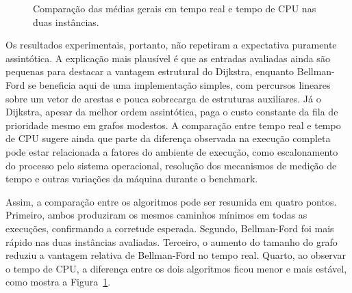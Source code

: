 \documentclass[12pt,a4paper]{article}
\begin{document}
\begin{figure}[h]
\centering
{}
\caption{Comparação das médias gerais em tempo real e tempo de CPU nas duas
instâncias.}
\label{fig:comparacao-tempo-real-cpu}
\end{figure}

Os resultados experimentais, portanto, não repetiram a expectativa puramente
assintótica. A explicação mais plausível é que as entradas avaliadas ainda são
pequenas para destacar a vantagem estrutural do Dijkstra, enquanto
Bellman-Ford se beneficia aqui de uma implementação simples, com percursos
lineares sobre um vetor de arestas e pouca sobrecarga de estruturas
auxiliares. Já o Dijkstra, apesar da melhor ordem assintótica, paga o custo
constante da fila de prioridade mesmo em grafos modestos. A comparação entre tempo real e tempo de CPU sugere ainda que parte da
diferença observada na execução completa pode estar relacionada a fatores do
ambiente de execução, como escalonamento do processo pelo sistema operacional,
resolução dos mecanismos de medição de tempo e outras variações da máquina
durante o benchmark.

Assim, a comparação entre os algoritmos pode ser resumida em quatro pontos.
Primeiro, ambos produziram os mesmos caminhos mínimos em todas as execuções,
confirmando a corretude esperada. Segundo, Bellman-Ford foi mais rápido nas
duas instâncias avaliadas. Terceiro, o aumento do tamanho do grafo reduziu a
vantagem relativa de Bellman-Ford no tempo real. Quarto, ao observar o tempo
de CPU, a diferença entre os dois algoritmos ficou menor e mais estável, como
mostra a Figura~\ref{fig:comparacao-tempo-real-cpu}.
\end{document}

